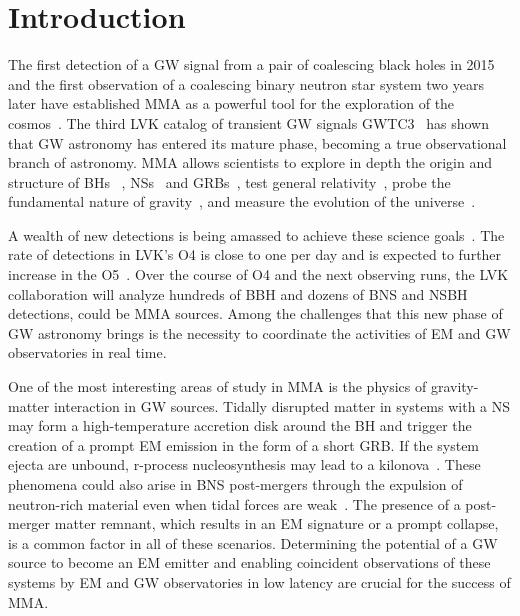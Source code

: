 \section{Introduction} \label{intro}

The first detection of a \ac{GW} signal from a pair of coalescing black holes in 2015 and the first observation of a coalescing binary neutron star system two years later have established
\ac{MMA} as a powerful tool for the exploration of the cosmos~\cite{LIGOScientific:2016aoc,LIGOScientific:2017vwq,LIGOScientific:2018cki}. The third \ac{LVK} catalog of transient \ac{GW}
signals \ac{GWTC3}~\cite{LIGOScientific:2021djp} has shown that \ac{GW} astronomy has entered its mature phase, becoming a true observational branch of astronomy. \ac{MMA} allows
scientists to explore in depth the origin and structure of \acp{BH} ~\cite{Schmidt:2020ekt,Nitz:2021zwj,Barack:2018yly}, \acp{NS}~\cite{Ruiz:2021gsv,Baiotti:2016qnr,Lasky:2015uia} and
\acp{GRB}~\cite{Murase:2019tjj,Ciolfi:2018tal}, test general relativity~\cite{LIGOScientific:2021sio,Berti:2018cxi,Berti:2018vdi,Isi:2019aib}, probe the fundamental nature of
gravity~\cite{LISA:2022yao,Barausse:2020rsu,Piorkowska-Kurpas:2022idw}, and measure the evolution of the universe~\cite{LIGOScientific:2021psn,LIGOScientific:2021aug}.

A wealth of new detections is being amassed to achieve these science goals~\cite{LIGOScientific:2014pky,VIRGO:2014yos}. The rate of detections in \ac{LVK}'s \ac{O4} is close to one per
day and is expected to further increase in the \ac{O5}~\cite{KAGRA:2013rdx}. Over the course of \ac{O4} and the next observing runs, the \ac{LVK} collaboration will analyze hundreds of
\ac{BBH} and dozens of \ac{BNS} and \ac{NSBH} detections,  could be \ac{MMA} sources. Among the challenges that this new phase of \ac{GW} astronomy brings is the necessity
to coordinate the activities of \ac{EM} and \ac{GW} observatories in real time. 

One of the most interesting areas of study in \ac{MMA} is the physics of gravity-matter interaction in \ac{GW} sources. Tidally disrupted matter in systems with a \ac{NS} may form a
high-temperature accretion disk around the \ac{BH} and trigger the creation of a prompt \ac{EM} emission in the form of a short \ac{GRB}. If the system ejecta are unbound, r-process
nucleosynthesis may lead to a kilonova~\cite{Lattimer:1974slx, Li:1998bw, Korobkin:2012uy, Barnes:2013wka, Tanaka:2013ana, Kasen:2014toa}. These phenomena could also arise in \ac{BNS}
post-mergers through the expulsion of neutron-rich material even when tidal forces are weak~\cite{LIGOScientific:2017ync, Arcavi:2017xiz, Coulter:2017wya, Kasliwal:2017ngb,
Lipunov:2017dwd, DES:2017kbs, Tanvir:2017pws}. The presence of a post-merger matter remnant, which results in an \ac{EM} signature or a prompt collapse, is a common factor in all of these
scenarios. Determining the potential of a \ac{GW} source to become an \ac{EM} emitter and enabling coincident observations of these systems by \ac{EM} and \ac{GW} observatories in low
latency are crucial for the success of \ac{MMA}.

